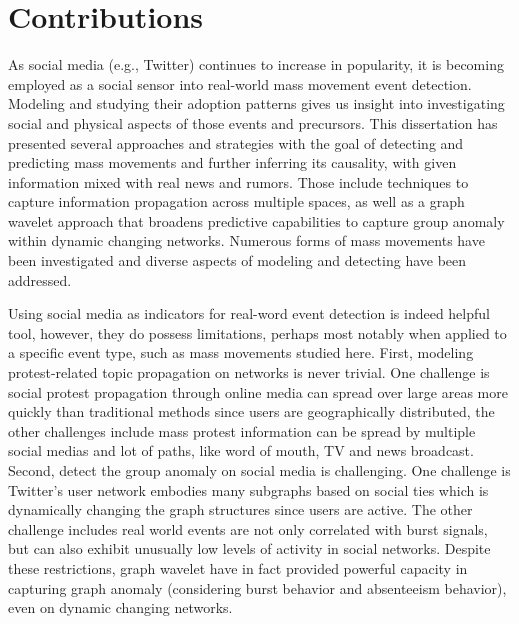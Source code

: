 \section{Contributions}
As social media (e.g., Twitter) continues to increase in popularity, it is becoming employed
as a social sensor into real-world mass movement event detection. Modeling and studying their adoption patterns gives us insight into investigating social and physical aspects of those events and precursors. This dissertation has presented several approaches and strategies with the goal of detecting and predicting mass movements and further inferring its causality, with given information mixed with real news and rumors. Those include techniques to capture information propagation across multiple spaces, as well as a graph wavelet approach that broadens predictive capabilities to capture group anomaly within dynamic changing networks. Numerous forms of mass movements have been investigated and diverse aspects of modeling and detecting have been addressed.

Using social media as indicators for real-word event detection is indeed helpful tool, however, they do possess limitations, perhaps most notably when applied to a specific event type, such as mass movements studied here. First, modeling protest-related topic propagation on networks is never trivial. One challenge is social protest propagation through online media can spread over large areas more quickly than traditional methods since users are geographically distributed, the other challenges include mass protest information can be spread by multiple social medias and lot of paths, like word of mouth, TV and news broadcast. Second, detect the group anomaly on social media is challenging. One challenge is Twitter's user network embodies many subgraphs based on social ties which is dynamically changing the graph structures since users are active. The other challenge includes real world events are not only correlated with burst signals, but can also exhibit unusually low levels of activity in social networks.
Despite these restrictions, graph wavelet have in fact provided powerful capacity in capturing graph anomaly (considering burst behavior and absenteeism behavior), even on dynamic changing networks.


